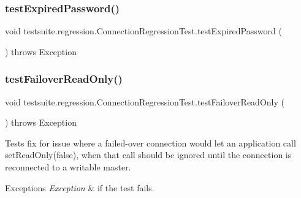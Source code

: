 \subsubsection{\texorpdfstring{test\+Expired\+Password()}{testExpiredPassword()}}
{\footnotesize\ttfamily void testsuite.\+regression.\+Connection\+Regression\+Test.\+test\+Expired\+Password (\begin{DoxyParamCaption}{ }\end{DoxyParamCaption}) throws Exception}

\mbox{\label{classtestsuite_1_1regression_1_1_connection_regression_test_a9b67a76ffbc55986621776106705e212}} 
\subsubsection{\texorpdfstring{test\+Failover\+Read\+Only()}{testFailoverReadOnly()}}
{\footnotesize\ttfamily void testsuite.\+regression.\+Connection\+Regression\+Test.\+test\+Failover\+Read\+Only (\begin{DoxyParamCaption}{ }\end{DoxyParamCaption}) throws Exception}

Tests fix for issue where a failed-\/over connection would let an application call set\+Read\+Only(false), when that call should be ignored until the connection is reconnected to a writable master.


\begin{DoxyExceptions}{Exceptions}
{\em Exception} & if the test fails. \\
\hline
\end{DoxyExceptions}
\mbox{\label{classtestsuite_1_1regression_1_1_connection_regression_test_a1cf7d5151c9a43346621a107c14d37a3}} 

